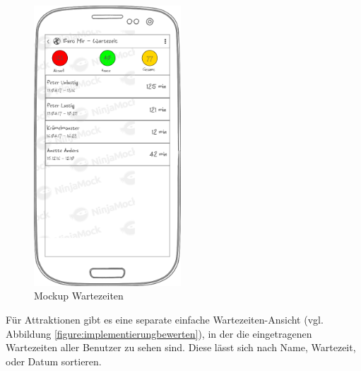 \begin{figure}[h]
\begin{minipage}{0.49\textwidth}
        \includegraphics[width=0.49\textwidth]{img/mockups/m_wartezeiten.png}
        \caption{Mockup Wartezeiten}
    \end{minipage}
\end{figure}

Für Attraktionen gibt es eine separate einfache Wartezeiten-Ansicht (vgl. Abbildung 
\ref{figure:implementierungbewerten}), in der die eingetragenen 
Wartezeiten aller Benutzer zu sehen sind. Diese lässt sich nach Name, Wartezeit, oder Datum 
sortieren.

